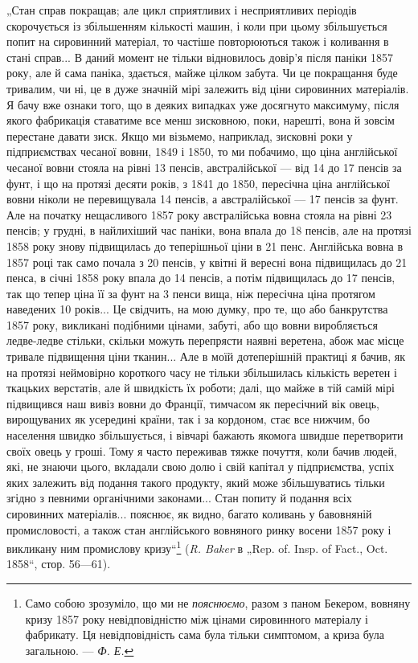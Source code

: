 
„Стан справ покращав; але цикл сприятливих і несприятливих
періодів скорочується із збільшенням кількості машин, і
коли при цьому збільшується попит на сировинний матеріал,
то частіше повторюються також і коливання в стані справ...
В даний момент не тільки відновилось довір’я після паніки
1857 року, але й сама паніка, здається, майже цілком забута.
Чи це покращання буде тривалим, чи ні, це в дуже значній
мірі залежить від ціни сировинних матеріалів. Я бачу вже ознаки
того, що в деяких випадках уже досягнуто максимуму, після
якого фабрикація ставатиме все менш зисковною, поки, нарешті,
вона й зовсім перестане давати зиск. Якщо ми візьмемо, наприклад,
зисковні роки у підприємствах чесаної вовни, 1849 і 1850,
то ми побачимо, що ціна англійської чесаної вовни стояла на
рівні 13 пенсів, австралійської — від 14 до 17 пенсів за фунт,
і що на протязі десяти років, з 1841 до 1850, пересічна ціна
англійської вовни ніколи не перевищувала 14 пенсів, а австралійської
— 17 пенсів за фунт. Але на початку нещасливого
1857 року австралійська вовна стояла на рівні 23 пенсів; у грудні,
в найлихіший час паніки, вона впала до 18 пенсів, але на протязі
1858 року знову підвищилась до теперішньої ціни в 21 пенс.
Англійська вовна в 1857 році так само почала з 20 пенсів, у квітні
й вересні вона підвищилась до 21 пенса, в січні 1858 року впала
до 14 пенсів, а потім підвищилась до 17 пенсів, так що тепер
ціна її за фунт на 3 пенси вища, ніж пересічна ціна протягом
наведених 10 років... Це свідчить, на мою думку, про те, що або
банкрутства 1857 року, викликані подібними цінами, забуті, або
що вовни виробляється ледве-ледве стільки, скільки можуть
перепрясти наявні веретена, абож має місце тривале підвищення
ціни тканин... Але в моїй дотеперішній практиці я бачив,
як на протязі неймовірно короткого часу не тільки збільшилась
кількість веретен і ткацьких верстатів, але й швидкість
їх роботи; далі, що майже в тій самій мірі підвищився наш вивіз
вовни до Франції, тимчасом як пересічний вік овець, вирощуваних
як усередині країни, так і за кордоном, стає все нижчим,
бо населення швидко збільшується, і вівчарі бажають якомога
швидше перетворити своїх овець у гроші. Тому я часто переживав
тяжке почуття, коли бачив людей, які, не знаючи цього, вкладали
свою долю і свій капітал у підприємства, успіх яких залежить від
подання такого продукту, який може збільшуватись тільки
згідно з певними органічними законами... Стан попиту й подання
всіх сировинних матеріалів... пояснює, як видно, багато коливань
у бавовняній промисловості, а також стан англійського вовняного
ринку восени 1857 року і викликану ним промислову кризу“\footnote{Само собою зрозуміло, що ми не \emph{пояснюємо}, разом з паном Бекером,
вовняну кризу 1857 року невідповідністю між цінами сировинного матеріалу
і фабрикату. Ця невідповідність сама була тільки симптомом, а криза була
загальною. — \emph{Ф. Е.}}
(\emph{R. Baker} в „Rep. of. Insp. of Fact., Oct. 1858“, стор. 56—61).
